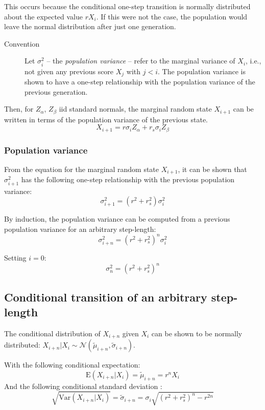 \documentclass[a4paper,11pt]{article}
\begin{document}
This occurs because the conditional one-step transition is normally distributed about the expected value $rX_i$. If this were not the case, the population would leave the normal distribution after just one generation.

\begin{description}
\item [Convention] Let $\sigma_i^2$ -- the \emph{population variance} -- refer to the marginal variance of $X_i$, i.e., not given any previous score $X_{j}$ with $j<i$. The population variance is shown to have a one-step relationship with the population variance of the previous generation.
\end{description}

Then, for $Z_\alpha$, $Z_\beta$ iid standard normals, the marginal random state $X_{i+1}$ can be written in terms of the population variance of the previous state.
$$X_{i+1} = r\sigma_iZ_\alpha + r_s\sigma_iZ_\beta$$

\subsubsection{Population variance}
From the equation for the marginal random state $X_{i+1}$, it can be shown that $\sigma_{i+1}^2$ has the following one-step relationship with the previous population variance:
$$\sigma_{i+1}^2 = (r^2+r_s^2)  \sigma_i^2$$

By induction, the population variance can be computed from a previous population variance for an arbitrary step-length:
$$\sigma_{i+n}^2 = (r^2+r_s^2)^n  \sigma_{i}^2$$

Setting $i=0$:
$$\sigma_n^2 = (r^2+r_s^2)^n$$


\subsection{Conditional transition of an arbitrary step-length}

The conditional distribution of $X_{i+n}$ given $X_i$ can be shown to be normally distributed: $X_{i+n}|X_i \sim \mathcal{N}( \tilde{\mu}_{i+n}, \tilde{\sigma}_{i+n})$.

With the following conditional expectation:
$$\mathrm{E}(X_{i+n}|X_i) = \tilde{\mu}_{i+n} = r^nX_i$$
And the following conditional standard deviation :
$$\sqrt{\mathrm{Var}(X_{i+n}|X_i)} = \tilde{\sigma}_{i+n} = \sigma_i \sqrt{(r^2+r_s^2)^n-r^{2n}}$$
\end{document}
